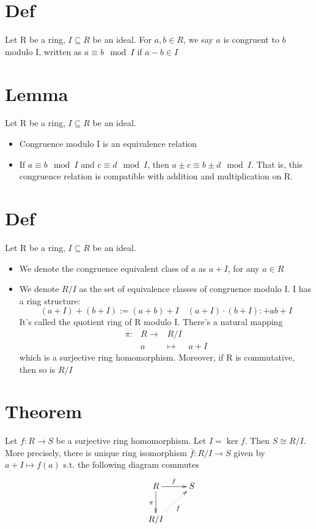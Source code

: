 \documentclass{book}
\begin{document}
\section{Def}
Let R be a ring, $I\subseteq R$ be an ideal. For $a,b\in R$, we say $a$ is congruent to $b$ modulo I, written as $a\equiv b\mod I$ if $a-b\in I$
\section{Lemma}
Let R be a ring, $I\subseteq R$ be an ideal.\begin{itemize}
	\item Congruence modulo I is an equivalence relation
	\item If $a\equiv b\mod I$ and $c\equiv d\mod I$, then $a\pm c\equiv b\pm d\mod I$. That is, this congruence relation is compatible with addition and multiplication on R.
\end{itemize}
\section{Def}
Let R be a ring, $I\subseteq R$ be an ideal.
\begin{itemize}
	\item We denote the congruence equivalent class of $a$ as $a+I$, for any $a\in R$
	\item We denote $R/I$ as the set of equivalence classes of congruence modulo I. I has a ring structure:$$(a+I)+(b+I):=(a+b)+I\quad(a+I)\cdot(b+I):+ab+I$$It's called the quotient ring of R modulo I. There's a natural mapping$$\begin{aligned}
		\pi:&R\to& R/I\\&a&\mapsto&a+I
	\end{aligned}$$which is a surjective ring homomorphism. Moreover, if R is commutative, then so is $R/I$
\end{itemize}
\section{Theorem}
Let $f:R\to S$ be a surjective ring homomorphism. Let $I=\ker f$. Then $S\cong R/I$. More precisely, there is unique ring isomorphism $\overline f:R/I\to S$ given by $a+I\mapsto f(a)$ s.t. the following diagram commutes$$\xymatrix{
	&R\ar[r]^f\ar[d]_\pi&S\\
	&R/I\ar@{..>}[ur]_f
}$$
\end{document}
